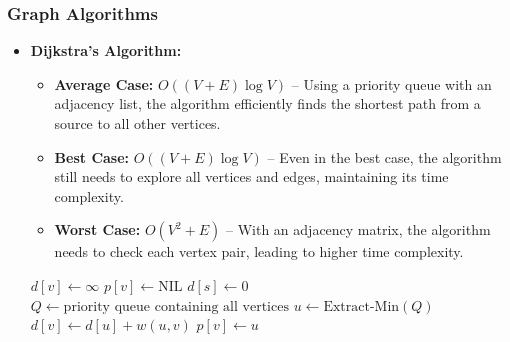 \documentclass[12pt]{book} %
\begin{document}
\subsubsection{Graph Algorithms}
\begin{itemize}
    \item \textbf{Dijkstra’s Algorithm:}
        \begin{itemize}
            \item \textbf{Average Case:} $O((V + E) \log V)$ – Using a priority queue with an adjacency list, the algorithm efficiently finds the shortest path from a source to all other vertices.
            \item \textbf{Best Case:} $O((V + E) \log V)$ – Even in the best case, the algorithm still needs to explore all vertices and edges, maintaining its time complexity.
            \item \textbf{Worst Case:} $O(V^2 + E)$ – With an adjacency matrix, the algorithm needs to check each vertex pair, leading to higher time complexity.
        \end{itemize}
        \begin{algorithm}
            \caption{Dijkstra's Algorithm}
            \begin{algorithmic}[1]
                        \State $d[v] \gets \infty$
                        \State $p[v] \gets \text{NIL}$
                    \EndFor
                    \State $d[s] \gets 0$
                    \State $Q \gets \text{priority queue containing all vertices}$
                        \State $u \gets \text{Extract-Min}(Q)$
                                \State $d[v] \gets d[u] + w(u, v)$
                                \State $p[v] \gets u$
                            \EndIf
                        \EndFor
                    \EndWhile
                    \EndProcedure
                \end{algorithmic}
            \end{algorithm}
\end{itemize}
\end{document}
